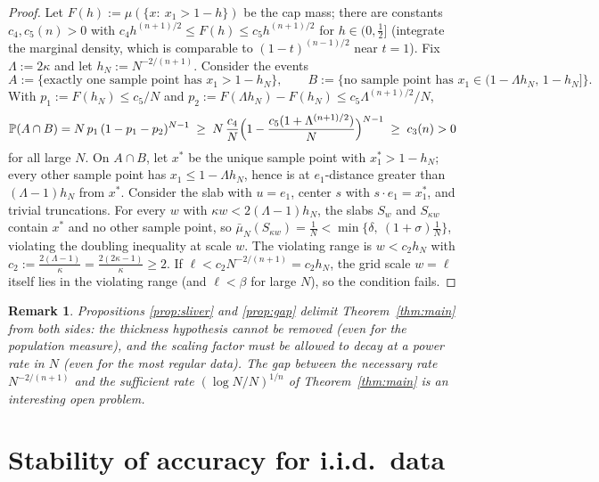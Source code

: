\documentclass[11pt]{article}
\newtheorem{remark}[theorem]{Remark}
\newcommand{\PP}{\mathbb{P}}
\newcommand{\emp}{\bar\mu_N}
\begin{document}
\begin{proof}
Let $F(h):=\mu(\{x:\ x_1>1-h\})$ be the cap mass; there are constants
$c_4,c_5(n)>0$ with $c_4h^{(n+1)/2}\le F(h)\le c_5h^{(n+1)/2}$ for $h\in(0,\tfrac12]$
(integrate the marginal density, which is comparable to $(1-t)^{(n-1)/2}$ near
$t=1$).  Fix $\Lambda:=2\kappa$ and let $h_N:=N^{-2/(n+1)}$.  Consider the events
\[
A:=\{\text{exactly one sample point has }x_1>1-h_N\},
\qquad
B:=\{\text{no sample point has }x_1\in(1-\Lambda h_N,\,1-h_N]\}.
\]
With $p_1:=F(h_N)\le c_5/N$ and
$p_2:=F(\Lambda h_N)-F(h_N)\le c_5\Lambda^{(n+1)/2}/N$,
\[
\PP(A\cap B)=N\,p_1\,(1-p_1-p_2)^{N-1}
\;\ge\;N\,\frac{c_4}{N}\Bigl(1-\frac{c_5(1+\Lambda^{(n+1)/2})}{N}\Bigr)^{N-1}
\;\ge\;c_3(n)>0
\]
for all large $N$.  On $A\cap B$, let $x^*$ be the unique sample point with
$x_1^*>1-h_N$; every other sample point has $x_1\le1-\Lambda h_N$, hence is at
$e_1$-distance greater than $(\Lambda-1)h_N$ from $x^*$.  Consider the slab with
$u=e_1$, center $s$ with $s\cdot e_1=x^*_1$, and trivial truncations.  For every
$w$ with $\kappa w<2(\Lambda-1)h_N$, the slabs $S_w$ and $S_{\kappa w}$ contain
$x^*$ and no other sample point, so
$\emp(S_{\kappa w})=\frac1N<\min\{\delta,\ (1+\sigma)\frac1N\}$, violating the
doubling inequality at scale $w$.  The violating range is
$w<c_2h_N$ with $c_2:=\frac{2(\Lambda-1)}{\kappa}=\frac{2(2\kappa-1)}{\kappa}\ge2$.
If $\ell<c_2N^{-2/(n+1)}=c_2h_N$, the grid scale $w=\ell$ itself lies in the
violating range (and $\ell<\beta$ for large $N$), so the condition fails.
\end{proof}

\begin{remark}
Propositions \ref{prop:sliver} and \ref{prop:gap} delimit
Theorem~\ref{thm:main} from both sides: the thickness hypothesis cannot be removed
(even for the population measure), and the scaling factor must be allowed to decay
at a power rate in $N$ (even for the most regular data).  The gap between the
necessary rate $N^{-2/(n+1)}$ and the sufficient rate $(\log N/N)^{1/n}$ of
Theorem~\ref{thm:main} is an interesting open problem.
\end{remark}

\section{Stability of accuracy for i.i.d.\ data}\label{sec:corollary}
\end{document}
